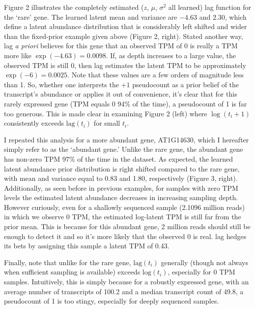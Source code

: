 \documentclass[11pt]{article}
\begin{document}
Figure 2 illustrates the completely estimated ($z$, $\mu$, $\sigma^2$ all learned) lag function for the `rare' gene. The learned latent mean and variance are $-4.63$ and $2.30$, which define a latent abundance distribution that is considerably left shifted and wider than the fixed-prior example given above (Figure 2, right). Stated another way, lag \emph{a priori} believes for this gene that an observed TPM of 0 is really a TPM more like $\exp(-4.63) = 0.0098$. If, as depth increases to a large value, the observed TPM is still 0, then lag estimates the latent TPM to be approximately $\exp(-6) = 0.0025$. Note that these values are a few orders of magnitude less than 1. So, whether one interprets the $+1$ pseudocount as a prior belief of the transcript's abundance or applies it out of convenience, it's clear that for this rarely expressed gene (TPM equals 0 94$\%$ of the time), a pseudocount of 1 is far too generous. This is made clear in examining Figure 2 (left) where $\log(t_i + 1)$ consistently exceeds $\textrm{lag}(t_i)$ for small $t_i$.  

I repeated this analysis for a more abundant gene, AT1G14630, which I hereafter simply refer to as the `abundant gene.' Unlike the rare gene, the abundant gene has non-zero TPM 97$\%$ of the time in the dataset. As expected, the learned latent abundance prior distribution is right shifted compared to the rare gene, with mean and variance equal to 0.83 and 1.80, respectively (Figure 3, right). Additionally, as seen before in previous examples, for samples with zero TPM levels the estimated latent abundance decreases in increasing sampling depth. However curiously, even for a shallowly sequenced sample (2.1096 million reads) in which we observe 0 TPM, the estimated log-latent TPM is still far from the prior mean. This is because for this abundant gene, 2 million reads should still be enough to detect it and so it's more likely that the observed 0 is real. lag hedges its bets by assigning this sample a latent TPM of 0.43.

Finally, note that unlike for the rare gene, $\textrm{lag}(t_i)$ generally (though not always when sufficient sampling is available) exceeds $\textrm{log}(t_i)$, especially for 0 TPM samples. Intuitively, this is simply because for a robustly expressed gene, with an average number of transcripts of 100.2 and a median transcript count of 49.8, a pseudocount of 1 is too stingy, especially for deeply sequenced samples.
 
\end{document}
